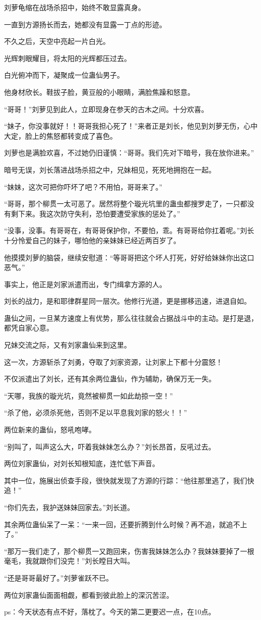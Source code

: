 \begin{this_body}
刘萝龟缩在战场杀招中，始终不敢显露真身。

一直到方源扬长而去，她都没有显露一丁点的形迹。

不久之后，天空中亮起一片白光。

光辉刺眼耀目，将太阳的光辉都压过去。

白光俯冲而下，凝聚成一位蛊仙男子。

他身材欣长。鞋拔子脸，黄豆般的小眼睛，满脸焦躁和怒意。

“哥哥！”刘萝见到此人，立即现身在参天的古木之间。十分欢喜。

“妹子，你没事就好！！哥哥我担心死了！”来者正是刘长，他见到刘萝无伤，心中大定，脸上的焦怒都转变成了喜色。

刘萝也是满脸欢喜，不过她仍旧谨慎：“哥哥。我们先对下暗号，我在放你进来。”

暗号无误，刘长落进战场杀招之中，兄妹相见，死死地拥抱在一起。

“妹妹，这次可把你吓坏了吧？不用怕，哥哥来了。”

“哥哥，那个柳贯一太可恶了。居然将整个璇光坑里的蛊虫都搜罗走了，一只都没有剩下来。我这次防守失利，恐怕要遭受家族的惩处了。”

“没事，没事。有哥哥在，有哥哥保护你，不要怕，乖。有哥哥给你扛着呢。”刘长十分怜爱自己的妹子，哪怕他的亲妹妹已经近两百岁了。

他摸摸刘萝的脑袋，继续安慰道：“等哥哥把这个坏人打死，好好给妹妹你出这口恶气。”

事实上，他正是刘家派遣而出，专门缉拿方源的人。

刘长的战力，是和耶律群星同一层次。他修行光道，更是挪移迅速，进退自如。

蛊仙之间，一旦某方速度上有优势，那么往往就会占据战斗中的主动。是打是退，都凭自家心意。

兄妹交流之际，又有刘家蛊仙来到这里。

这一次，方源斩杀了刘勇，夺取了刘家资源，让刘家上下都十分震怒！

不仅派遣出了刘长，还有其余两位蛊仙，作为辅助，确保万无一失。

“天哪，我族的璇光坑，竟然被柳贯一如此劫掠一空！”

“杀了他，必须杀死他，否则不足以平息我刘家的怒火！！”

两位新来的蛊仙，怒吼咆哮。

“别叫了，叫声这么大，吓着我妹妹怎么办？”刘长昂首，反吼过去。

两位刘家蛊仙，对刘长知根知底，连忙低下声音。

其中一位，施展出侦查手段，很快就发现了方源的行踪：“他往那里逃了，我们快追！”

“你们先去，我护送妹妹回家去。”刘长道。

其余两位蛊仙呆了一呆：“一来一回，还要折腾到什么时候？再不追，就追不上了。”

“那万一我们走了，那个柳贯一又跑回来，伤害我妹妹怎么办？我妹妹要掉了一根毫毛，我就跟你们没完！”刘长瞠目大叫。

“还是哥哥最好了。”刘萝雀跃不已。

两位刘家蛊仙面面相觑，都看到彼此脸上的深沉苦涩。

ps：今天状态有点不好，落枕了。今天的第二更要迟一点，在10点。

\end{this_body}

